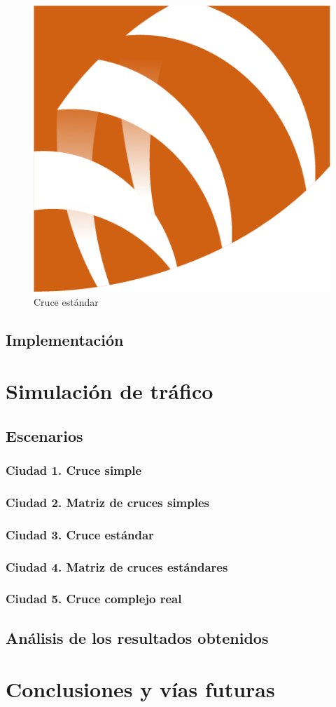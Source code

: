 \begin{figure}
    \centering
    \includegraphics[width=\linewidth]{image/etsiit_logo.png}
    \caption{Cruce estándar}
    \label{fig:cruce_estandar}
\end{figure}


\chapter{Implementación}

\part{Simulación de tráfico}
\chapter{Escenarios}
\section{Ciudad 1. Cruce simple}
\section{Ciudad 2. Matriz de cruces simples}
\section{Ciudad 3. Cruce estándar}
\section{Ciudad 4. Matriz de cruces estándares}
\section{Ciudad 5. Cruce complejo real}

\chapter{Análisis de los resultados obtenidos}

\part{Conclusiones y vías futuras}

